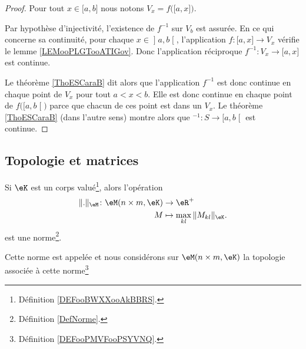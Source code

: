 \begin{proof}
	Pour tout \( x\in \mathopen[ a , b \mathclose]\) nous notons \( V_x=f\big( \mathopen[ a , x \mathclose] \big)\).

	Par hypothèse d'injectivité, l'existence de \( f^{-1}\) sur \( V_b\) est assurée. En ce qui concerne sa continuité, pour chaque \( x\in\mathopen] a , b \mathclose[\), l'application \( f\colon \mathopen[ a , x \mathclose]\to V_x\) vérifie le lemme \ref{LEMooPLGTooATIGov}. Donc l'application réciproque \( f^{-1}\colon V_x\to \mathopen[ a , x \mathclose]\) est continue.

	Le théorème \ref{ThoESCaraB} dit alors que l'application \( f^{-1}\) est donc continue en chaque point de \( V_x \) pour tout \( a<x<b\). Elle est donc continue en chaque point de \( f\big( \mathopen[ a , b \mathclose[ \big)\) parce que chacun de ces point est dans un \( V_x\). Le théorème \ref{ThoESCaraB}  (dans l'autre sens) montre alors que \( ^{-1}\colon S\to \mathopen[ a , b \mathclose[\) est continue.
\end{proof}


\subsection{Topologie et matrices}

\begin{lemmaDef}      \label{DEFooCQHDooYpUAhG}
	Si \( \eK\) est un corps valué\footnote{Définition \ref{DEFooBWXXooAkBBRS}.}, alors l'opération
	\begin{equation}
		\begin{aligned}
			\| . \|_{\eM}\colon \eM(n\times m,\eK) & \to \eR^+                             \\
			M                                      & \mapsto  \max_{kl}\| M_{kl} \|_{\eK}.
		\end{aligned}
	\end{equation}
	est une norme\footnote{Définition \ref{DefNorme}.}.

	Cette norme est appelée  et nous considérons sur \( \eM(n\times m, \eK)\) la topologie associée à cette norme\footnote{Définition \ref{DEFooPMVFooPSYVNQ}.}
\end{lemmaDef}

